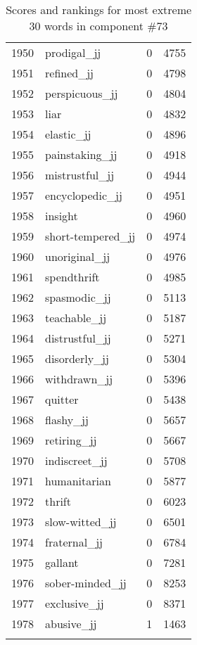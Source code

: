 \begin{longtable}[!htbp]{| rlr@{.}l |}
    1950 & prodigal\_jj & 0 & 4755 \\
    1951 & refined\_jj & 0 & 4798 \\
    1952 & perspicuous\_jj & 0 & 4804 \\
    1953 & liar & 0 & 4832 \\
    1954 & elastic\_jj & 0 & 4896 \\
    1955 & painstaking\_jj & 0 & 4918 \\
    1956 & mistrustful\_jj & 0 & 4944 \\
    1957 & encyclopedic\_jj & 0 & 4951 \\
    1958 & insight & 0 & 4960 \\
    1959 & short-tempered\_jj & 0 & 4974 \\
    1960 & unoriginal\_jj & 0 & 4976 \\
    1961 & spendthrift & 0 & 4985 \\
    1962 & spasmodic\_jj & 0 & 5113 \\
    1963 & teachable\_jj & 0 & 5187 \\
    1964 & distrustful\_jj & 0 & 5271 \\
    1965 & disorderly\_jj & 0 & 5304 \\
    1966 & withdrawn\_jj & 0 & 5396 \\
    1967 & quitter & 0 & 5438 \\
    1968 & flashy\_jj & 0 & 5657 \\
    1969 & retiring\_jj & 0 & 5667 \\
    1970 & indiscreet\_jj & 0 & 5708 \\
    1971 & humanitarian & 0 & 5877 \\
    1972 & thrift & 0 & 6023 \\
    1973 & slow-witted\_jj & 0 & 6501 \\
    1974 & fraternal\_jj & 0 & 6784 \\
    1975 & gallant & 0 & 7281 \\
    1976 & sober-minded\_jj & 0 & 8253 \\
    1977 & exclusive\_jj & 0 & 8371 \\
    1978 & abusive\_jj & 1 & 1463 \\
    \hline
    \caption{Scores and rankings for most extreme 30 words in component \#73} \\
\end{longtable}
